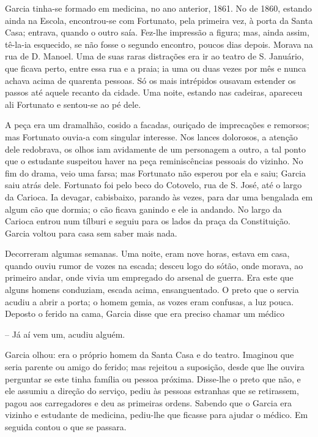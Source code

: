 Garcia tinha-se formado em medicina, no ano anterior, 1861. No de 1860,
estando ainda na Escola, encontrou-se com Fortunato, pela primeira vez,
à porta da Santa Casa; entrava, quando o outro saía. Fez-lhe impressão a
figura; mas, ainda assim, tê-la-ia esquecido, se não fosse o segundo
encontro, poucos dias depois. Morava na rua de D. Manoel. Uma de suas
raras distrações era ir ao teatro de S. Januário, que ficava perto,
entre essa rua e a praia; ia uma ou duas vezes por mês e nunca achava
acima de quarenta pessoas. Só os mais intrépidos ousavam estender os
passos até aquele recanto da cidade. Uma noite, estando nas cadeiras,
apareceu ali Fortunato e sentou-se ao pé dele.

A peça era um dramalhão, cosido a facadas, ouriçado de imprecações e
remorsos; mas Fortunato ouvia-a com singular interesse. Nos lances
dolorosos, a atenção dele redobrava, os olhos iam avidamente de um
personagem a outro, a tal ponto que o estudante suspeitou haver na peça
reminiscências pessoais do vizinho. No fim do drama, veio uma farsa; mas
Fortunato não esperou por ela e saiu; Garcia saiu atrás dele. Fortunato
foi pelo beco do Cotovelo, rua de S. José, até o largo da Carioca. Ia
devagar, cabisbaixo, parando às vezes, para dar uma bengalada em algum
cão que dormia; o cão ficava ganindo e ele ia andando. No largo da
Carioca entrou num tílburi e seguiu para os lados da praça da
Constituição. Garcia voltou para casa sem saber mais nada.

Decorreram algumas semanas. Uma noite, eram nove horas, estava em casa,
quando ouviu rumor de vozes na escada; desceu logo do sótão, onde
morava, ao primeiro andar, onde vivia um empregado do arsenal de guerra.
Era este que alguns homens conduziam, escada acima, ensanguentado. O
preto que o servia acudiu a abrir a porta; o homem gemia, as vozes eram
confusas, a luz pouca. Deposto o ferido na cama, Garcia disse que era
preciso chamar um médico

-- Já aí vem um, acudiu alguém.

Garcia olhou: era o próprio homem da Santa Casa e do teatro. Imaginou
que seria parente ou amigo do ferido; mas rejeitou a suposição, desde
que lhe ouvira perguntar se este tinha família ou pessoa próxima.
Disse-lhe o preto que não, e ele assumiu a direção do serviço, pediu às
pessoas estranhas que se retirassem, pagou aos carregadores e deu as
primeiras ordens. Sabendo que o Garcia era vizinho e estudante de
medicina, pediu-lhe que ficasse para ajudar o médico. Em seguida contou
o que se passara.

